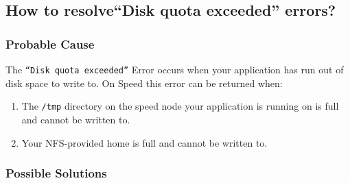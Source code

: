 \documentclass{easychair}
\begin{document}
\subsection{How to resolve``Disk quota exceeded'' errors?}

\subsubsection{Probable Cause}

The \texttt{``Disk quota exceeded''} Error occurs when your application has run out of disk space to write to. On Speed this error can be returned when:
\begin{enumerate}
	\item
The \texttt{/tmp} directory on the speed node your application is running on is full and cannot be written to.
	\item
Your NFS-provided home is full and cannot be written to.
\end{enumerate}

\subsubsection{Possible Solutions}
\end{document}
